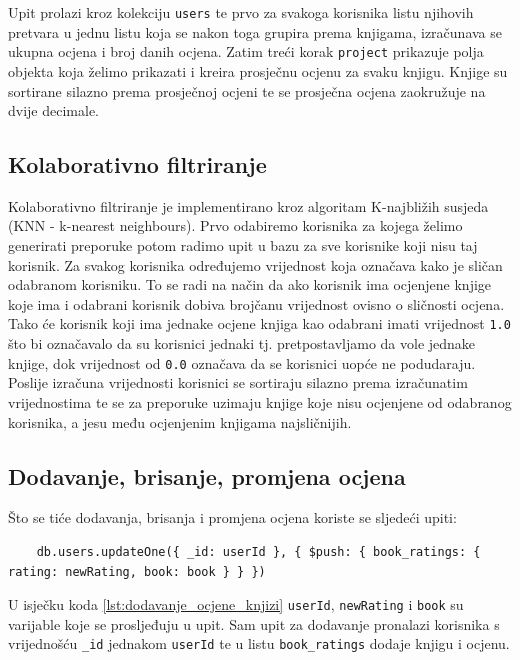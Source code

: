 \documentclass[]{foi}
\begin{document}
Upit prolazi kroz kolekciju \texttt{users} te prvo za svakoga korisnika listu njihovih pretvara u jednu listu koja se nakon toga
grupira prema knjigama, izračunava se ukupna ocjena i broj danih ocjena. Zatim treći korak \texttt{project} prikazuje polja
objekta koja želimo prikazati i kreira prosječnu ocjenu za svaku knjigu. Knjige su sortirane silazno prema prosječnoj ocjeni
te se prosječna ocjena zaokružuje na dvije decimale.

\subsection{Kolaborativno filtriranje}

Kolaborativno filtriranje je implementirano kroz algoritam K-najbližih susjeda (KNN - k-nearest neighbours).
Prvo odabiremo korisnika za kojega želimo generirati preporuke potom radimo upit u bazu za sve korisnike koji nisu taj korisnik.
Za svakog korisnika određujemo vrijednost koja označava kako je sličan odabranom korisniku.
To se radi na način da ako korisnik ima ocjenjene knjige koje ima i odabrani korisnik dobiva brojčanu vrijednost ovisno o
sličnosti ocjena. Tako će korisnik koji ima jednake ocjene knjiga kao odabrani imati vrijednost \texttt{1.0} što bi označavalo
da su korisnici jednaki tj. pretpostavljamo da vole jednake knjige, dok vrijednost od \texttt{0.0} označava da se korisnici uopće
ne podudaraju. Poslije izračuna vrijednosti korisnici se sortiraju silazno prema izračunatim vrijednostima te se za preporuke
uzimaju knjige koje nisu ocjenjene od odabranog korisnika, a jesu među ocjenjenim knjigama najsličnijih.

\subsection{Dodavanje, brisanje, promjena ocjena}

Što se tiće dodavanja, brisanja i promjena ocjena koriste se sljedeći upiti:
\begin{verbatim}
    db.users.updateOne({ _id: userId }, { $push: { book_ratings: { rating: newRating, book: book } } })
\end{verbatim}
\label{lst:dodavanje_ocjene_knjizi}

U isječku koda \ref{lst:dodavanje_ocjene_knjizi} \texttt{userId}, \texttt{newRating} i \texttt{book} su varijable koje
se prosljeđuju u upit. Sam upit za dodavanje pronalazi korisnika s vrijednošću \texttt{\_id} jednakom \texttt{userId} te u
listu \texttt{book\_ratings} dodaje knjigu i ocjenu.
\end{document}
